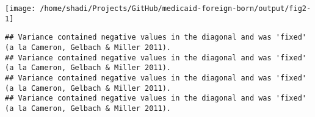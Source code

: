 \documentclass[
]{article}
\begin{document}
\begin{center}\texttt{[image: /home/shadi/Projects/GitHub/medicaid-foreign-born/output/fig2-1]} \end{center}

\FloatBarrier

\begin{verbatim}
## Variance contained negative values in the diagonal and was 'fixed' (a la Cameron, Gelbach & Miller 2011).
## Variance contained negative values in the diagonal and was 'fixed' (a la Cameron, Gelbach & Miller 2011).
## Variance contained negative values in the diagonal and was 'fixed' (a la Cameron, Gelbach & Miller 2011).
## Variance contained negative values in the diagonal and was 'fixed' (a la Cameron, Gelbach & Miller 2011).
\end{verbatim}
\end{document}
